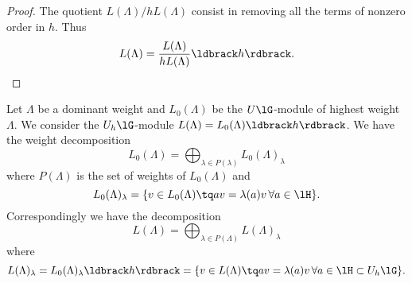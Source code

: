 \begin{proof}
	The quotient \( L(\Lambda)/hL(\Lambda)\) consist in removing all the terms of nonzero order in \( h\). Thus
	\begin{equation}
		L(\Lambda)=\frac{ L(\Lambda) }{ hL(\Lambda) }\ldbrack h\rdbrack.
	\end{equation}

\end{proof}

\begin{proposition}
	Let \( \Lambda\) be a dominant weight and \( L_0(\Lambda)\) be the \( U\lG\)-module of highest weight \( \Lambda\). We consider the \( U_h\lG\)-module \( L(\Lambda)=L_0(\Lambda)\ldbrack h\rdbrack\). We have the weight decomposition
	\begin{equation}
		L_0(\Lambda)=\bigoplus_{\lambda\in P(\lambda)}L_0(\Lambda)_{\lambda}
	\end{equation}
	where \( P(\Lambda)\) is the set of weights of \( L_0(\Lambda)\) and
	\begin{equation}
		L_0(\Lambda)_{\lambda}=\{ v\in L_0(\Lambda)\tq av=\lambda(a)v\,\forall a\in\lH \}.
	\end{equation}
	Correspondingly we have the decomposition
	\begin{equation}
		L(\Lambda)=\bigoplus_{\lambda\in P(\Lambda)}L(\Lambda)_{\lambda}
	\end{equation}
	where
	\begin{equation}
		L(\Lambda)_{\lambda}=L_0(\Lambda)_{\lambda}\ldbrack h\rdbrack=\{ v\in L(\Lambda)\tq av=\lambda(a)v\,\forall a\in\lH\subset U_h\lG \}.
	\end{equation}

\end{proposition}

